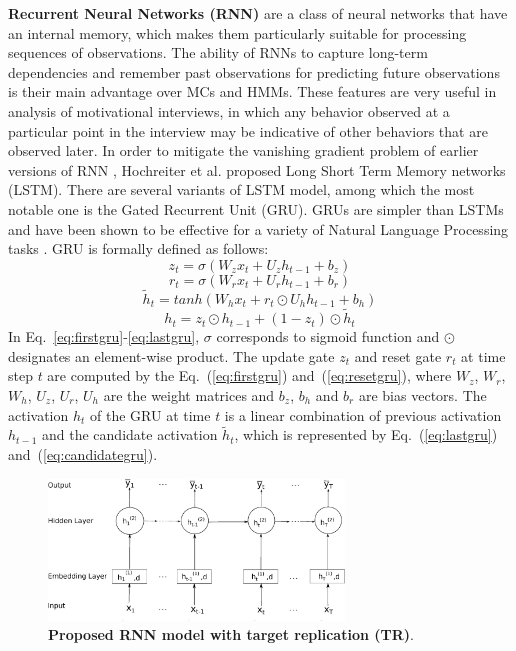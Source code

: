 \documentclass{amia_summit_2018}
\begin{document}
\textbf {Recurrent Neural Networks (RNN)} are a class of neural networks that have an internal memory, which makes them particularly suitable for processing sequences of observations. The ability of RNNs to capture long-term dependencies and remember past observations for predicting future observations is their main advantage over MCs and HMMs. These features are very useful in analysis of motivational interviews, in which any behavior observed at a particular point in the interview may be indicative of other behaviors that are observed later. In order to mitigate the vanishing gradient problem of earlier versions of RNN \cite{bengio1993problem}, Hochreiter et al.\cite{hochreiter1997long} proposed Long Short Term Memory networks (LSTM). There are several variants of LSTM model, among which the most notable one is the Gated Recurrent Unit\cite{cho2014properties} (GRU). GRUs are simpler than LSTMs and have been shown to be effective for a variety of Natural Language Processing tasks \cite{cho2014properties}. GRU is formally defined as follows:
\begin{equation}
z_t = \sigma(W_zx_t + U_zh_{t-1} + b_z)
\label{eq:firstgru}
\end{equation}
\begin{equation}
r_t = \sigma(W_rx_t + U_rh_{t-1} + b_r)
\label{eq:resetgru}
\end{equation}
\begin{equation}
\tilde h_t = tanh(W_hx_t + r_t \odot U_hh_{t-1} + b_h) 
\label{eq:candidategru}
\end{equation}
\begin{equation}
h_t = z_t \odot h_{t-1} + (1-z_t) \odot \tilde h_t
\label{eq:lastgru}
\end{equation}  
In Eq.~\ref{eq:firstgru}-\ref{eq:lastgru}, $\sigma$ corresponds to sigmoid function and $\odot$ designates an element-wise product. The update gate $z_t$ and reset gate $r_t$ at time step $t$ are computed by the Eq.~(\ref{eq:firstgru}) and~(\ref{eq:resetgru}), where $W_z$, $W_r$, $W_h$, $U_z$, $U_r$, $U_h$ are the weight matrices and $b_z$, $b_h$ and $b_r$ are bias vectors. The activation $h_t$ of the GRU at time $t$ is a linear combination of previous activation $h_{t-1}$ and the candidate activation $\tilde h_t$, which is represented by Eq.~(\ref{eq:lastgru}) and~(\ref{eq:candidategru}).
  
\begin{figure}[!htb]
    \centering
    \includegraphics[width=0.70\textwidth]{figures/rnn_small.eps}
    \caption{\textbf{Proposed RNN model with target replication (TR)}.}
    \label{fig:rnn-model}
\end{figure}
\end{document}
